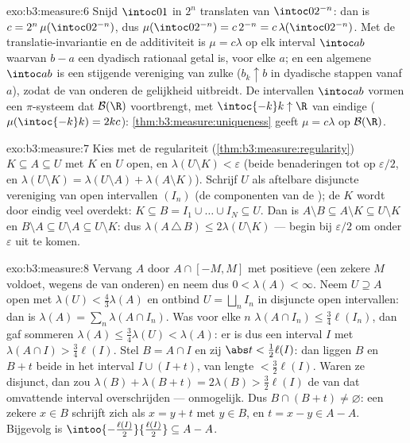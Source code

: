 \begin{solution}{exo:b3:measure:6}
Snijd $\intoc01$ in $2^n$ translaten van $\intoc0{2^{-n}}$: dan is
$c = 2^n\,\mu(\intoc0{2^{-n}})$, dus $\mu(\intoc0{2^{-n}}) =
c\,2^{-n} = c\,\lambda(\intoc0{2^{-n}})$. Met de
translatie-invariantie en de additiviteit is $\mu = c\lambda$ op
elk interval $\intoc ab$ waarvan $b - a$ een dyadisch rationaal
getal is, voor elke $a$; en een algemene $\intoc ab$ is een
stijgende vereniging van zulke ($b_k \uparrow b$ in dyadische
stappen vanaf $a$), zodat de  van onderen de
gelijkheid uitbreidt. De intervallen $\intoc ab$ vormen een
$\pi$-systeem dat $\mathcal B(\R)$ voortbrengt, met $\intoc{-k}k
\uparrow \R$ van eindige  ($\mu(\intoc{-k}k) = 2kc$):
\cref{thm:b3:measure:uniqueness} geeft $\mu = c\lambda$ op
$\mathcal B(\R)$.
\end{solution}

\begin{solution}{exo:b3:measure:7}
Kies met de regulariteit (\cref{thm:b3:measure:regularity}) $K
\subseteq A \subseteq U$ met $K$  en $U$ open, en
$\lambda(U\setminus K) < \varepsilon$ (beide benaderingen tot op
$\varepsilon/2$, en $\lambda(U \setminus K) = \lambda(U\setminus
A) + \lambda(A \setminus K)$). Schrijf $U$ als aftelbare
disjuncte vereniging van open intervallen $(I_n)$ (de componenten
van de ); de  $K$ wordt door eindig veel
overdekt: $K \subseteq B = I_1\cup\dots\cup I_N \subseteq U$. Dan
is $A \setminus B \subseteq A\setminus K \subseteq U\setminus K$
en $B \setminus A \subseteq U \setminus A \subseteq U\setminus K$:
dus $\lambda(A\,\triangle\,B) \leq 2\lambda(U\setminus K)$ ---
begin bij $\varepsilon/2$ om onder $\varepsilon$ uit te komen.
\end{solution}

\begin{solution}{exo:b3:measure:8}
Vervang $A$ door $A \cap [-M, M]$ met positieve  (een zekere
$M$ voldoet, wegens de  van onderen) en neem dus $0 <
\lambda(A) < \infty$. Neem $U \supseteq A$ open met $\lambda(U) <
\frac43\lambda(A)$ en ontbind $U = \bigsqcup_nI_n$ in disjuncte
open intervallen: dan is $\lambda(A) = \sum_n\lambda(A\cap I_n)$.
Was voor elke $n$ $\lambda(A\cap I_n) \leq \frac34\ell(I_n)$, dan
gaf sommeren $\lambda(A) \leq \frac34\lambda(U) < \lambda(A)$: er
is dus een interval $I$ met $\lambda(A\cap I) > \frac34\ell(I)$.
Stel $B = A \cap I$ en zij $\abs t < \frac12\ell(I)$: dan liggen
$B$ en $B + t$ beide in het interval $I \cup (I + t)$, van lengte
$< \frac32\ell(I)$. Waren ze disjunct, dan zou $\lambda(B) +
\lambda(B + t) = 2\lambda(B) > \frac32\ell(I)$ de  van dat
omvattende interval overschrijden --- onmogelijk. Dus $B \cap (B +
t) \neq \varnothing$: een zekere $x \in B$ schrijft zich als $x =
y + t$ met $y \in B$, en $t = x - y \in A - A$. Bijgevolg is
$\intoo{-\frac{\ell(I)}2}{\frac{\ell(I)}2} \subseteq A - A$.
\end{solution}

